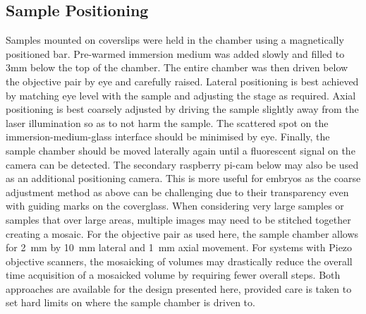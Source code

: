 
\subsection{Sample Positioning}

Samples mounted on coverslips were held in the chamber using a magnetically positioned bar.
Pre-warmed immersion medium was added slowly and filled to 3mm below the top of the chamber.
The entire chamber was then driven below the objective pair by eye and carefully raised.
Lateral positioning is best achieved by matching eye level with the sample and adjusting the stage as required.
Axial positioning is best coarsely adjusted by driving the sample slightly away from the laser illumination so as to not harm the sample.
The scattered spot on the immersion-medium-glass interface should be minimised by eye.
Finally, the sample chamber should be moved laterally again until a fluorescent signal on the camera can be detected.
The secondary raspberry pi-cam below may also be used as an additional positioning camera.
This is more useful for embryos as the coarse adjustment method as above can be challenging due to their transparency even with guiding marks on the coverglass.
When considering very large samples or samples that over large areas, multiple images may need to be stitched together creating a mosaic.
For the objective pair as used here, the sample chamber allows for \SI{2}{\milli\metre} by \SI{10}{\milli\metre} lateral and \SI{1}{\milli\metre} axial movement.
For systems with Piezo objective scanners, the mosaicking of volumes may drastically reduce the overall time acquisition of a mosaicked volume by requiring fewer overall steps.
Both approaches are available for the design presented here, provided care is taken to set hard limits on where the sample chamber is driven to.


